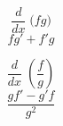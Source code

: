 \documentclass[avery5371,grid]{flashcards}
\begin{document}
\begin{flashcard}{\large \vspace*{\fill} \[ \dfrac{d}{dx}\; \big( fg \big) \] \vspace*{\fill}   }{\large \vspace*{\fill} \[ fg'+f'g   \] \vspace*{\fill}   }\end{flashcard}

\begin{flashcard}{\large \vspace*{\fill} \[ \dfrac{d}{dx}\; \left( \dfrac{f}{g} \right)  \] \vspace*{\fill}   }{\large \vspace*{\fill} \[ \dfrac{gf' - g' f}{g^2}   \] \vspace*{\fill}   }\end{flashcard}
\end{document}
